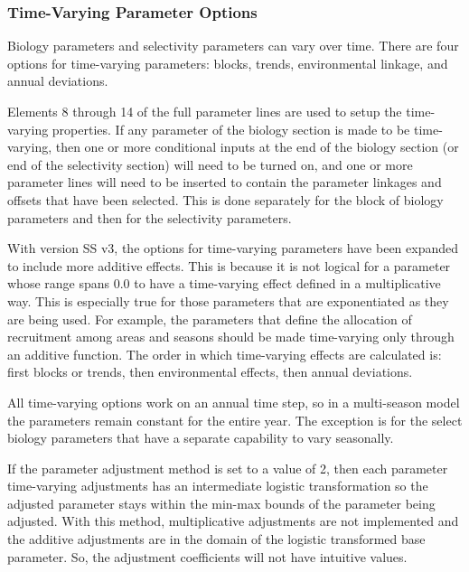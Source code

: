 \subsubsection{Time-Varying Parameter Options}
Biology parameters and selectivity parameters can vary over time.  There are four options for time-varying parameters:  blocks, trends, environmental linkage, and annual deviations.

Elements 8 through 14 of the full parameter lines are used to setup the time-varying properties.  If any parameter of the biology section is made to be time-varying, then one or more conditional inputs at the end of the biology section (or end of the selectivity section) will need to be turned on, and one or more parameter lines will need to be inserted to contain the parameter linkages and offsets that have been selected.  This is done separately for the block of biology parameters and then for the selectivity parameters.

With version SS v3, the options for time-varying parameters have been expanded to include more additive effects.  This is because it is not logical for a parameter whose range spans 0.0 to have a time-varying effect defined in a multiplicative way.  This is especially true for those parameters that are exponentiated as they are being used.  For example, the parameters that define the allocation of recruitment among areas and seasons should be made time-varying only through an additive function.
The order in which time-varying effects are calculated is:  first blocks or trends, then environmental effects, then annual deviations.

All time-varying options work on an annual time step, so in a multi-season model the parameters remain constant for the entire year.  The exception is for the select biology parameters that have a separate capability to vary seasonally.

If the parameter adjustment method is set to a value of 2, then each parameter time-varying adjustments has an intermediate logistic transformation so the adjusted parameter stays within the min-max bounds of the parameter being adjusted.  With this method, multiplicative adjustments are not implemented and the additive adjustments are in the domain of the logistic transformed base parameter.  So, the adjustment coefficients will not have intuitive values.

